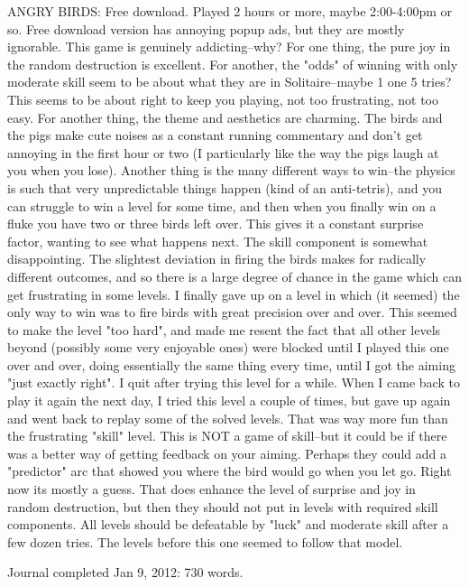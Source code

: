 \documentclass[]{article}
\begin{document}
ANGRY BIRDS: Free download.  Played 2 hours or more, maybe 2:00-4:00pm
or so.  Free download version has annoying popup ads, but they are
mostly ignorable.  This game is genuinely addicting--why?  For one
thing, the pure joy in the random destruction is excellent.  For
another, the "odds" of winning with only moderate skill seem to be
about what they are in Solitaire--maybe 1 one 5 tries?  This seems to
be about right to keep you playing, not too frustrating, not too easy.
For another thing, the theme and aesthetics are charming.  The birds
and the pigs make cute noises as a constant running commentary and
don't get annoying in the first hour or two (I particularly like the
way the pigs laugh at you when you lose).  Another thing is the many
different ways to win--the physics is such that very unpredictable
things happen (kind of an anti-tetris), and you can struggle to win a
level for some time, and then when you finally win on a fluke you have
two or three birds left over.  This gives it a constant surprise
factor, wanting to see what happens next.  The skill component is
somewhat disappointing.  The slightest deviation in firing the birds
makes for radically different outcomes, and so there is a large degree
of chance in the game which can get frustrating in some levels.  I
finally gave up on a level in which (it seemed) the only way to win
was to fire birds with great precision over and over.  This seemed to
make the level "too hard", and made me resent the fact that all other
levels beyond (possibly some very enjoyable ones) were blocked until I
played this one over and over, doing essentially the same thing every
time, until I got the aiming "just exactly right".  I quit after
trying this level for a while.  When I came back to play it again the
next day, I tried this level a couple of times, but gave up again and
went back to replay some of the solved levels.  That was way more fun
than the frustrating "skill" level.  This is NOT a game of skill--but
it could be if there was a better way of getting feedback on your
aiming.  Perhaps they could add a "predictor" arc that showed you
where the bird would go when you let go.  Right now its mostly a
guess.  That does enhance the level of surprise and joy in random
destruction, but then they should not put in levels with required
skill components.  All levels should be defeatable by "luck" and
moderate skill after a few dozen tries.  The levels before this one
seemed to follow that model.

Journal completed Jan 9, 2012:  730 words.
\end{document}

